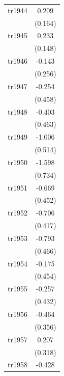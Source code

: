 \begin{table}[htbp]
\begin{tabular}{l*{1}{c}}
\addlinespace
tr1944              &       0.209         \\
                    &     (0.164)         \\
\addlinespace
tr1945              &       0.233         \\
                    &     (0.148)         \\
\addlinespace
tr1946              &      -0.143         \\
                    &     (0.256)         \\
\addlinespace
tr1947              &      -0.254         \\
                    &     (0.458)         \\
\addlinespace
tr1948              &      -0.403         \\
                    &     (0.463)         \\
\addlinespace
tr1949              &      -1.006\sym{*}  \\
                    &     (0.514)         \\
\addlinespace
tr1950              &      -1.598\sym{**} \\
                    &     (0.734)         \\
\addlinespace
tr1951              &      -0.669         \\
                    &     (0.452)         \\
\addlinespace
tr1952              &      -0.706\sym{*}  \\
                    &     (0.417)         \\
\addlinespace
tr1953              &      -0.793\sym{*}  \\
                    &     (0.466)         \\
\addlinespace
tr1954              &      -0.175         \\
                    &     (0.454)         \\
\addlinespace
tr1955              &      -0.257         \\
                    &     (0.432)         \\
\addlinespace
tr1956              &      -0.464         \\
                    &     (0.356)         \\
\addlinespace
tr1957              &       0.207         \\
                    &     (0.318)         \\
\addlinespace
tr1958              &      -0.428         \\

\end{tabular}
\end{table}
